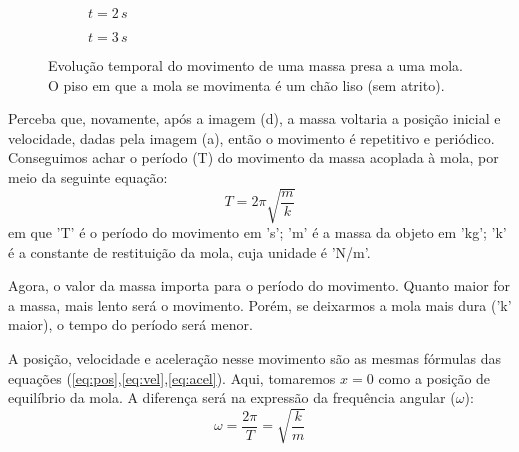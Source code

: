 \documentclass[12pt]{extarticle}
\newcommand{\<}{\langle}
\renewcommand{\>}{\rangle}
\theoremstyle{definition}
\begin{document}
\begin{figure}[H]
\begin{subfigure}[b]{0.7\linewidth}
    \caption{$t=2\,s$}
    \label{fig:t=2}
    \end{subfigure}
    \hfill
    \begin{subfigure}[b]{0.7\linewidth}
    \caption{$t=3\,s$}
    \label{fig:t=3}
    \end{subfigure}
    
    \caption{Evolução temporal do movimento de uma massa presa a uma mola. O piso em que a mola se movimenta é um chão liso (sem atrito).}
\end{figure}

Perceba que, novamente, após a imagem (d), a massa voltaria a posição inicial e velocidade, dadas pela imagem (a), então o movimento é repetitivo e periódico. Conseguimos achar o período (T) do movimento da massa acoplada à mola, por meio da seguinte equação:
\begin{equation}
    T = 2\pi \sqrt{\frac{m}{k}}
\end{equation}
\noindent em que 'T' é o período do movimento em 's'; 'm' é a massa da objeto em 'kg'; 'k' é a constante de restituição da mola, cuja unidade é 'N/m'. 

Agora, o valor da massa importa para o período do movimento. Quanto maior for a massa, mais lento será o movimento. Porém, se deixarmos a mola mais dura ('k' maior), o tempo do período será menor.

A posição, velocidade e aceleração nesse movimento são as mesmas fórmulas das equações (\ref{eq:pos},\ref{eq:vel},\ref{eq:acel}). Aqui, tomaremos $x=0$ como a posição de equilíbrio da mola. A diferença será na expressão da frequência angular ($\omega$):
\begin{equation}
    \omega = \frac{2\pi}{T} = \sqrt{\frac{k}{m}}
\end{equation}
\end{document}
